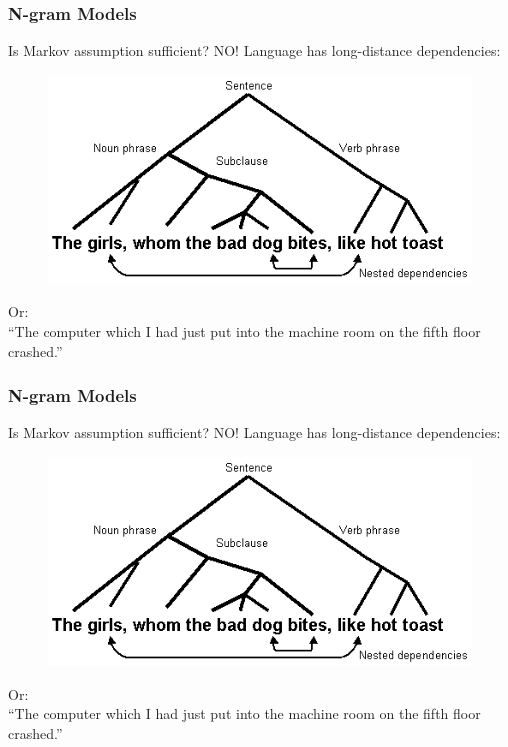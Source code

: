 \documentclass{beamer}
\begin{document}
\begin{frame}\frametitle{N-gram Models}

\begin{block}{Is Markov assumption sufficient? \alert{NO!}}
Language has long-distance dependencies:

\begin{figure}
\includegraphics[width=0.6\linewidth]{figure/long-distance-dependency.png}
\label{fig:long-distance-dependency}
\end{figure}

Or:  \\

``The computer which I had just put into the machine room on the fifth
floor crashed.'' 

\end{block}
\end{frame}


\begin{frame}\frametitle{N-gram Models}

\begin{block}{Is Markov assumption sufficient? \alert{NO!}}
Language has long-distance dependencies:

\begin{figure}
\includegraphics[width=0.6\linewidth]{figure/long-distance-dependency.png}
\label{fig:long-distance-dependency}
\end{figure}

Or:  \\

``The computer which I had just put into the machine room on the fifth
floor crashed.'' 

\end{block}
\end{frame}
\end{document}
